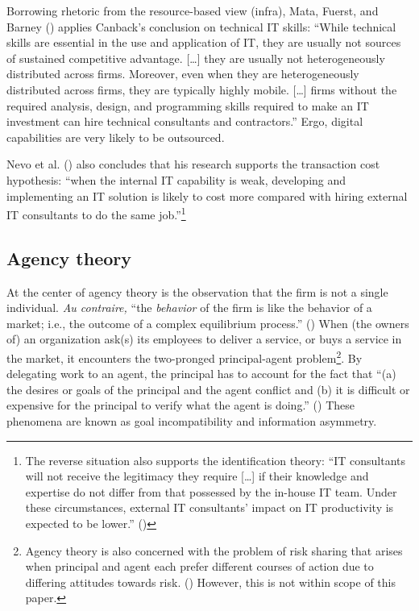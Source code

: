 \documentclass[
  man,floatsintext]{apa6}
\begin{document}
Borrowing rhetoric from the resource-based view (infra), Mata, Fuerst, and Barney () applies Canback's conclusion on technical IT skills: ``While technical skills are essential in the use and application of IT, they are usually not sources of sustained competitive advantage. {[}\ldots{]} they are usually not heterogeneously distributed across firms. Moreover, even when they are heterogeneously distributed across firms, they are typically highly mobile. {[}\ldots{]} firms without the required analysis, design, and programming skills required to make an IT investment can hire technical consultants and contractors.'' Ergo, digital capabilities are very likely to be outsourced.

Nevo et al. () also concludes that his research supports the transaction cost hypothesis: ``when the internal IT capability is weak, developing and implementing an IT solution is likely to cost more compared with hiring external IT consultants to do the same job.''\footnote{The reverse situation also supports the identification theory: ``IT consultants will not receive the legitimacy they require {[}\ldots{]} if their knowledge and expertise do not differ from that possessed by the in-house IT team. Under these circumstances, external IT consultants' impact on IT productivity is expected to be lower.'' ()}

\subsection{Agency theory}\label{agency-theory}

At the center of agency theory is the observation that the firm is not a single individual. \emph{Au contraire,} ``the \emph{behavior} of the firm is like the behavior of a market; i.e., the outcome of a complex equilibrium process.'' () When (the owners of) an organization ask(s) its employees to deliver a service, or buys a service in the market, it encounters the two-pronged principal-agent problem\footnote{Agency theory is also concerned with the problem of risk sharing that arises when principal and agent each prefer different courses of action due to differing attitudes towards risk. () However, this is not within scope of this paper.}. By delegating work to an agent, the principal has to account for the fact that ``(a) the desires or goals of the principal and the agent conflict and (b) it is difficult or expensive for the principal to verify what the agent is doing.'' () These phenomena are known as goal incompatibility and information asymmetry.
\end{document}
